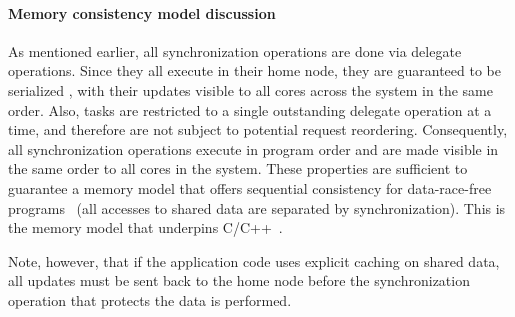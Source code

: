\paragraph{Memory consistency model discussion} As mentioned earlier, all
synchronization operations are done via delegate operations. Since they all
execute in their home node, they are guaranteed to be serialized , with their
updates visible to all cores across the system in the same order. Also, tasks
are restricted to a single outstanding delegate operation at a time, and
therefore are not subject to potential request reordering. Consequently, all
synchronization operations execute in program order and are made visible in
the same order to all cores in the system. These properties are sufficient to
guarantee a memory model that offers sequential consistency for data-race-free
programs~\cite{AdveHill1990} (all accesses to shared data are separated by
synchronization). This is the memory model that underpins C/C++~\cite{N2480,N2800}.

Note, however, that if the application code uses explicit caching on shared
data, all updates must be sent back to the home node before the
synchronization operation that protects the data is performed. 



